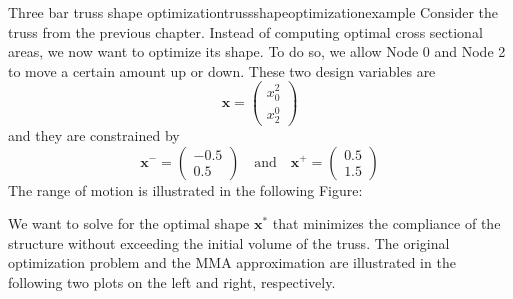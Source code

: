 \begin{example}{Three bar truss shape optimization}{trussshapeoptimizationexample}
    Consider the truss from the previous chapter. Instead of computing optimal cross sectional areas, we now want to optimize its shape. To do so, we allow Node 0 and Node 2 to move a certain amount up or down. These two design variables are 
    \begin{equation}
        \mathbf{x} = 
        \begin{pmatrix}
            x_0^2 \\ x_2^0
        \end{pmatrix}
    \end{equation}
    and they are constrained by 
    \begin{equation}
        \mathbf{x}^- = 
        \begin{pmatrix}
             -0.5\\ 0.5
        \end{pmatrix} 
        \quad 
        \text{and}
        \quad
        \mathbf{x}^+ = 
        \begin{pmatrix}
             0.5\\ 1.5
        \end{pmatrix} 
    \end{equation}
    The range of motion is illustrated in the following Figure:
    \begin{center}
        
    \end{center}

    We want to solve for the optimal shape $\mathbf{x}^*$ that minimizes the compliance of the structure without exceeding the initial volume of the truss. The original optimization problem and the MMA approximation are illustrated in the following two plots on the left and right, respectively.

    \begin{minipage}{.5\textwidth}
        \centering
        
    \end{minipage}%
    \begin{minipage}{.5\textwidth}
        \centering
        
    \end{minipage}


\end{example}

